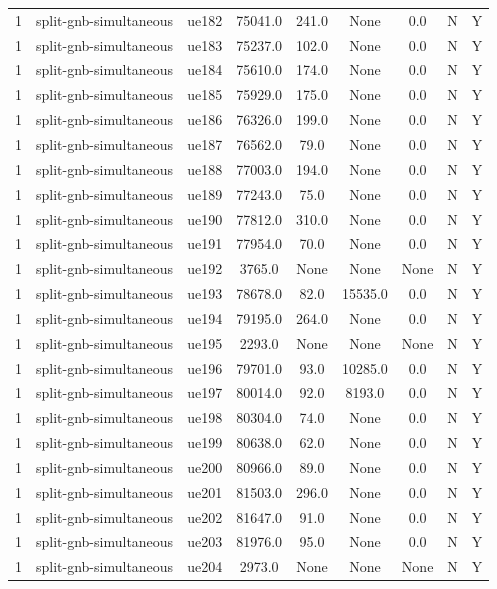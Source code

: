 \begin{table}[ht]
\begin{tabular}{|c|c|c|c|c|c|c|c|c|}
1 & split-gnb-simultaneous & ue182 & 75041.0 & 241.0 & None & 0.0 & N & Y \\
1 & split-gnb-simultaneous & ue183 & 75237.0 & 102.0 & None & 0.0 & N & Y \\
1 & split-gnb-simultaneous & ue184 & 75610.0 & 174.0 & None & 0.0 & N & Y \\
1 & split-gnb-simultaneous & ue185 & 75929.0 & 175.0 & None & 0.0 & N & Y \\
1 & split-gnb-simultaneous & ue186 & 76326.0 & 199.0 & None & 0.0 & N & Y \\
1 & split-gnb-simultaneous & ue187 & 76562.0 & 79.0 & None & 0.0 & N & Y \\
1 & split-gnb-simultaneous & ue188 & 77003.0 & 194.0 & None & 0.0 & N & Y \\
1 & split-gnb-simultaneous & ue189 & 77243.0 & 75.0 & None & 0.0 & N & Y \\
1 & split-gnb-simultaneous & ue190 & 77812.0 & 310.0 & None & 0.0 & N & Y \\
1 & split-gnb-simultaneous & ue191 & 77954.0 & 70.0 & None & 0.0 & N & Y \\
1 & split-gnb-simultaneous & ue192 & 3765.0 & None & None & None & N & Y \\
1 & split-gnb-simultaneous & ue193 & 78678.0 & 82.0 & 15535.0 & 0.0 & N & Y \\
1 & split-gnb-simultaneous & ue194 & 79195.0 & 264.0 & None & 0.0 & N & Y \\
1 & split-gnb-simultaneous & ue195 & 2293.0 & None & None & None & N & Y \\
1 & split-gnb-simultaneous & ue196 & 79701.0 & 93.0 & 10285.0 & 0.0 & N & Y \\
1 & split-gnb-simultaneous & ue197 & 80014.0 & 92.0 & 8193.0 & 0.0 & N & Y \\
1 & split-gnb-simultaneous & ue198 & 80304.0 & 74.0 & None & 0.0 & N & Y \\
1 & split-gnb-simultaneous & ue199 & 80638.0 & 62.0 & None & 0.0 & N & Y \\
1 & split-gnb-simultaneous & ue200 & 80966.0 & 89.0 & None & 0.0 & N & Y \\
1 & split-gnb-simultaneous & ue201 & 81503.0 & 296.0 & None & 0.0 & N & Y \\
1 & split-gnb-simultaneous & ue202 & 81647.0 & 91.0 & None & 0.0 & N & Y \\
1 & split-gnb-simultaneous & ue203 & 81976.0 & 95.0 & None & 0.0 & N & Y \\
1 & split-gnb-simultaneous & ue204 & 2973.0 & None & None & None & N & Y \\

\end{tabular}
\end{table}
